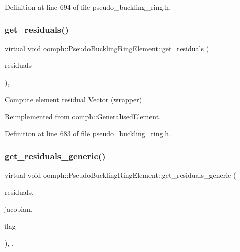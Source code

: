 Definition at line 694 of file pseudo\+\_\+buckling\+\_\+ring.\+h.

\mbox{\label{classoomph_1_1PseudoBucklingRingElement_ad4f6c2b06b3f114dd08db33781484641}} 
\subsubsection{\texorpdfstring{get\+\_\+residuals()}{get\_residuals()}}
{\footnotesize\ttfamily virtual void oomph\+::\+Pseudo\+Buckling\+Ring\+Element\+::get\+\_\+residuals (\begin{DoxyParamCaption}\item[{\hyperlink{classoomph_1_1Vector}{Vector}$<$ double $>$ \&}]{residuals }\end{DoxyParamCaption})\hspace{0.3cm}{\ttfamily [inline]}, {\ttfamily [virtual]}}



Compute element residual \hyperlink{classoomph_1_1Vector}{Vector} (wrapper) 



Reimplemented from \hyperlink{classoomph_1_1GeneralisedElement_a53d348ab71c86b53619129a1dd411d30}{oomph\+::\+Generalised\+Element}.



Definition at line 683 of file pseudo\+\_\+buckling\+\_\+ring.\+h.

\mbox{\label{classoomph_1_1PseudoBucklingRingElement_a6cde480f22d2a89a9322b172028eb8a9}} 
\subsubsection{\texorpdfstring{get\+\_\+residuals\+\_\+generic()}{get\_residuals\_generic()}}
{\footnotesize\ttfamily virtual void oomph\+::\+Pseudo\+Buckling\+Ring\+Element\+::get\+\_\+residuals\+\_\+generic (\begin{DoxyParamCaption}\item[{\hyperlink{classoomph_1_1Vector}{Vector}$<$ double $>$ \&}]{residuals,  }\item[{\hyperlink{classoomph_1_1DenseMatrix}{Dense\+Matrix}$<$ double $>$ \&}]{jacobian,  }\item[{unsigned}]{flag }\end{DoxyParamCaption})\hspace{0.3cm}{\ttfamily [inline]}, {\ttfamily [protected]}, {\ttfamily [virtual]}}



